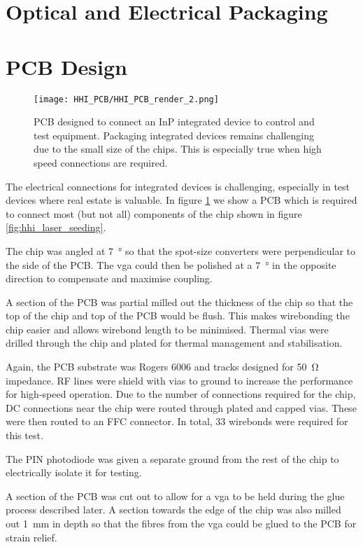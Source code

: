 \section{Optical and Electrical Packaging}

\section{PCB Design}

\begin{figure}[tbp]
	\centering
	\texttt{[image: HHI\_PCB/HHI\_PCB\_render\_2.png]}
	\caption[PCB breakout for an InP integrated circuit]{PCB designed to connect an \ac{InP} integrated device to control and test equipment. Packaging integrated devices remains challenging due to the small size of the chips. This is especially true when high speed connections are required.}
	\label{fig:hhi_pcb}
\end{figure}

The electrical connections for integrated devices is challenging, especially in test devices where real estate is valuable. In figure \ref{fig:hhi_pcb} we show a PCB which is required to connect most (but not all) components of the chip shown in figure \ref{fig:hhi_laser_seeding}. 

The chip was angled at \SI{7}{\degree} so that the spot-size converters were perpendicular to the side of the PCB. The \ac{vga} could then be polished at a \SI{7}{\degree} in the opposite direction to compensate and maximise coupling.

A section of the PCB was partial milled out the thickness of the chip so that the top of the chip and top of the PCB would be flush. This makes wirebonding the chip easier and allows wirebond length to be minimised. Thermal vias were drilled through the chip and plated for thermal management and stabilisation. 

Again, the PCB substrate was Rogers 6006 and tracks designed for \SI{50}{\ohm} impedance. RF lines were shield with vias to ground to increase the performance for high-speed operation. Due to the number of connections required for the chip, DC connections near the chip were routed through plated and capped vias. These were then routed to an FFC connector. In total, 33 wirebonds were required for this test.

The PIN photodiode was given a separate ground from the rest of the chip to electrically isolate it for testing.

A section of the PCB was cut out to allow for a \ac{vga} to be held during the glue process described later. A section towards the edge of the chip was also milled out \SI{1}{mm} in depth so that the fibres from the \ac{vga} could be glued to the PCB for strain relief.

